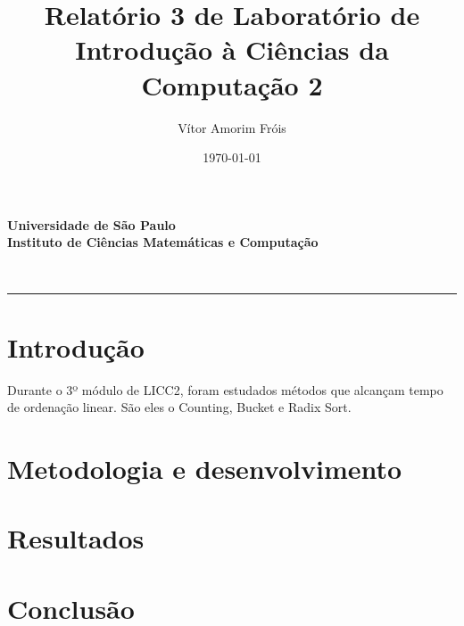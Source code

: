 \documentclass[fontsize=11pt]{article}
\title{
\Large{Relatório 3 de Laboratório de Introdução à Ciências da Computação 2}\\
[10pt] 
}
\author{Vítor Amorim Fróis}
\date{\today}
\makeatletter
\renewenvironment{abstract} %
 {\small
  \begin{center}
  \bfseries \abstractname\vspace{-.5em}\vspace{0pt}
  \end{center}
  \list{}{%
    \setlength{\leftmargin}{0mm}
    \setlength{\rightmargin}{\leftmargin}%
  }
  \item\relax}
 {\endlist}
\renewcommand{\maketitle}{\bgroup\setlength{\parindent}{0pt}%
\begin{center}
    \textbf{
      Universidade de São Paulo\\
      Instituto de Ciências Matemáticas e Computação
    }
\end{center}
\begin{flushleft}
  \textbf{\@title}
  \@author\\
  [3pt] 
  \@date
\end{flushleft}\egroup
}
\makeatother
\begin{document}
\maketitle
 
\begin{abstract}
    

\end{abstract}

\rule{\linewidth}{0.2pt}

\section{Introdução}
    Durante o 3º módulo de LICC2, foram estudados métodos que alcançam tempo de
    ordenação linear. São eles o Counting, Bucket e Radix Sort.

\section{Metodologia e desenvolvimento}

\section{Resultados}
    
\section{Conclusão}




\end{document}
